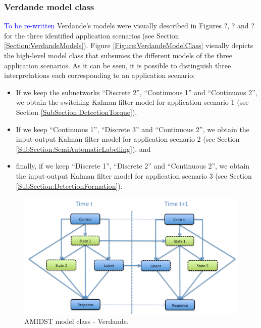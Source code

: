 \subsubsection{Verdande model class}\label{verdandeAMIDSTModels}
\textcolor{blue}{To be re-written}
Verdande's models were visually described in Figures ?, ? and ? for the three identified application scenarios (see Section \ref{Section:VerdandeModels}). Figure \ref{Figure:VerdandeModelClass} visually depicts the high-level model class that subsumes the different models of the three application scenarios. As it can be seen, it is possible to distinguish three interpretations each corresponding to an application scenario:

\begin{itemize}
\item If we keep the subnetworks ``Discrete 2'', ``Continuous 1'' and ``Continuous 2'', we obtain the switching Kalman filter model for application scenario 1 (see Section \ref{SubSection:DetectionTorque}),
\item If we keep ``Continuous 1'', ``Discrete 3'' and ``Continuous 2'', we obtain the input-output Kalman filter model for application scenario 2 (see Section \ref{SubSection:SemiAutomaticLabelling}), and
\item finally, if we keep ``Discrete 1'', ``Discrete 2'' and ``Continuous 2'', we obtain the input-output Kalman filter model for application scenario 3  (see Section \ref{SubSection:DetectionFormation}).
\end{itemize}



\begin{figure}[ht!]
\begin{center}
\includegraphics[scale=0.39]{./figures/AMIDSTModelClassVerdande}
\caption{\label{Figure:AMIDSTModelClassVerdande} AMIDST model class - Verdande.}
\end{center}
\end{figure}

